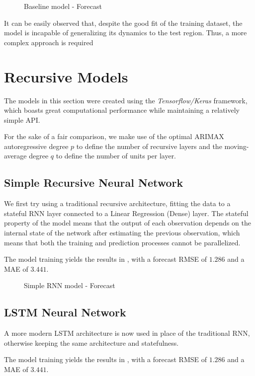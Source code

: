 \documentclass{scrartcl}
\begin{document}
  \begin{figure}[ht]
    \centering
    
    \caption{Baseline model - Forecast}
    \label{fig:baseline_fit}
  \end{figure}

  It can be easily observed that, despite the good fit of the training dataset, the model is incapable of generalizing its dynamics to the test region. Thus, a more complex approach is required

\section{Recursive Models}

  The models in this section were created using the \emph{Tensorflow/Keras} framework, which boasts great computational performance while maintaining a relatively simple API.

  For the sake of a fair comparison, we make use of the optimal ARIMAX autoregressive degree $p$ to define the number of recursive layers and the moving-average degree $q$ to define the number of units per layer.

  \subsection{Simple Recursive Neural Network}

    We first try using a traditional recursive architecture, fitting the data to a stateful RNN layer connected to a Linear Regression (Dense) layer. The stateful property of the model means that the output of each observation depends on the internal state of the network after estimating the previous observation, which means that both the training and prediction processes cannot be parallelized.

    The model training yields the results in , with a forecast RMSE of $1.286$ and a MAE of $3.441$. 

    \begin{figure}[ht]
      \centering
      
      \caption{Simple RNN model - Forecast}
      \label{fig:rnn_fit}
    \end{figure}

  \subsection*{LSTM Neural Network}
    
    A more modern LSTM architecture is now used in place of the traditional RNN, otherwise keeping the same architecture and statefulness.

    The model training yields the results in , with a forecast RMSE of $1.286$ and a MAE of $3.441$.
\end{document}
